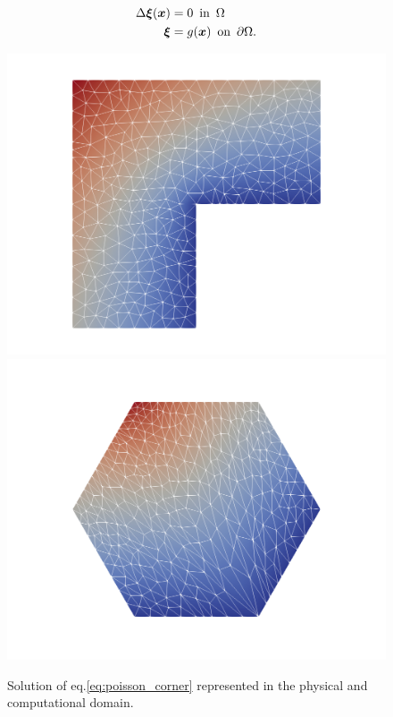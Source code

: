 \documentclass[a4paper,11pt]{article}
\begin{document}
\begin{equation}
\label{eq:map_domain}
\begin{split}
    \Delta \boldsymbol \xi(\boldsymbol x) &= 0 \, \text{ in } \, \Omega \\
    \boldsymbol \xi &= g(\boldsymbol x) \, \text{ on } \, \partial \Omega.
\end{split}
\end{equation}

\begin{figure}[h!]\label{fig:mesh_Winslow}
    \centering
    \includegraphics[scale=0.2]{Images/Test1/r-adaptive/u.png}
    \includegraphics[scale=0.2]{Images/Test1/r-adaptive/u_c.png}
    \caption{Solution of eq.\eqref{eq:poisson_corner} represented in the physical and computational domain.}
    \label{fig:initial_mesh}
\end{figure}
\end{document}
